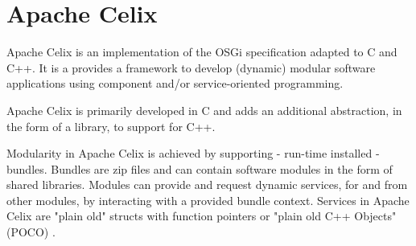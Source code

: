 \section{Apache Celix} 
Apache Celix is an implementation of the OSGi
specification adapted to C and C++. It is a provides a framework to develop
(dynamic) modular software applications using component and/or service-oriented
programming.

Apache Celix is primarily developed in C and adds an additional abstraction, in
the form of a library, to support for C++.

Modularity in Apache Celix is achieved by supporting - run-time installed -
bundles. Bundles are zip files and can contain software modules in the form of
shared libraries. Modules can provide and request dynamic services, for and from
other modules, by interacting with a provided bundle context. Services in Apache
Celix are "plain old" structs with function pointers or "plain old C++ Objects"
(POCO) \cite{hid-sp18-401_Apache_Celix}.
